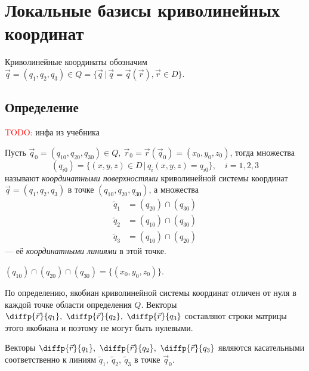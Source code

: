 \section{Локальные базисы криволинейных координат}

Криволинейные координаты обозначим $\vec{q} = (q_1, q_2, q_3) \in
Q = \{ \vec{q} \, | \, \vec{q} = \vec{q}(\vec{r}), \vec{r} \in D \}$.

\subsection{Определение}

\textcolor{red}{TODO:} инфа из учебника

\begin{definition}
  Пусть $\vec{q}_0 = (q_{10}, q_{20}, q_{30}) \in Q,~\vec{r}_0 =
  \vec{r}(\vec{q}_0) = (x_0, y_0, z_0)$, тогда множества
  \begin{equation}
    (q_{i0}) = \{ (x,y,z) \in D \, | \, q_i(x,y,z) = q_{i0} \}, \quad i = 1,2,3
  \end{equation}
  называют \textit{координатными поверхностями} криволинейной системы координат
  $\vec{q} = (q_1, q_2, q_3)$ в точке $(q_{10}, q_{20}, q_{30})$, а множества
  \begin{equation}
    \begin{aligned}
      \tilde{q}_1 &= (q_{20}) \cap (q_{30}) \\
      \tilde{q}_2 &= (q_{10}) \cap (q_{30}) \\
      \tilde{q}_3 &= (q_{10}) \cap (q_{20})
    \end{aligned}
  \end{equation}
  --- её \textit{координатными линиями} в этой точке.
\end{definition}

\begin{remark}
  $(q_{10}) \cap (q_{20}) \cap (q_{30}) = \{ (x_0, y_0, z_0) \}$.
\end{remark}

По определению, якобиан криволинейной системы координат отличен от нуля в
каждой точке области определения $Q$. Векторы
$\diffp{\vec{r}}{{q_1}},~\diffp{\vec{r}}{{q_2}},~\diffp{\vec{r}}{{q_3}}$
составляют строки матрицы этого якобиана и поэтому не могут быть нулевыми.

\begin{theorem}
  Векторы
  $\diffp{\vec{r}}{{q_1}},~\diffp{\vec{r}}{{q_2}},~\diffp{\vec{r}}{{q_3}}$
  являются касательными соответственно к линиям
  $\tilde{q}_1,~\tilde{q}_2,~\tilde{q}_3$ в точке $\vec{q}_0$.
\end{theorem}

